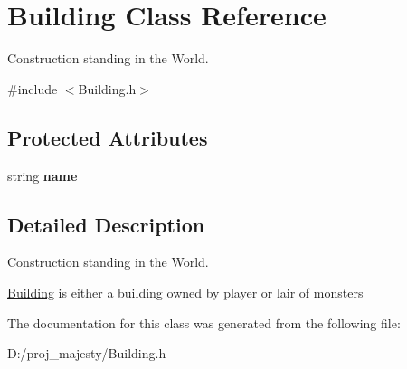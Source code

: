 \hypertarget{class_building}{}\section{Building Class Reference}
\label{class_building}


Construction standing in the World.  




{\ttfamily \#include $<$Building.\+h$>$}

\subsection*{Protected Attributes}
\begin{DoxyCompactItemize}
\item 
string {\bfseries name}\hypertarget{class_building_a20eadaa6a940a4b9f9841305ee84d62f}{}\label{class_building_a20eadaa6a940a4b9f9841305ee84d62f}

\end{DoxyCompactItemize}


\subsection{Detailed Description}
Construction standing in the World. 

\hyperlink{class_building}{Building} is either a building owned by player or lair of monsters 

The documentation for this class was generated from the following file\+:\begin{DoxyCompactItemize}
\item 
D\+:/proj\+\_\+majesty/Building.\+h\end{DoxyCompactItemize}
